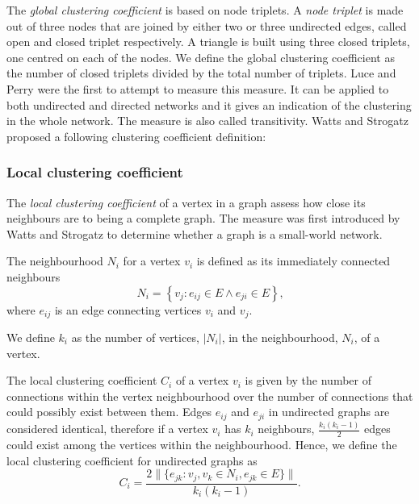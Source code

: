         The \emph{global clustering coefficient} is based on node triplets. A \emph{node triplet} is made out of three nodes that are joined by either two or three undirected edges, called open and closed triplet respectively. A triangle is built using three closed triplets, one centred on each of the nodes. We define the global clustering coefficient as the number of closed triplets divided by the total number of triplets. Luce and Perry were the first to attempt to measure this measure\cite{LucePerry1949}. It can be applied to both undirected and directed networks and it gives an indication of the clustering in the whole network. The measure is also called transitivity\cite{WassermanFaust1994}. Watts and Strogatz proposed a following clustering coefficient definition: \cite{WattsStrogatz1998}

      \subsubsection{Local clustering coefficient}

        The \emph{local clustering coefficient} of a vertex in a graph assess how close its neighbours are to being a complete graph. The measure was first introduced by Watts and Strogatz to determine whether a graph is a small-world network\cite{WattsStrogatz1998}.

        The neighbourhood $N_i$ for a vertex $v_i$ is defined as its immediately connected neighbours
        \begin{equation}
          N_i = \left\{v_j: e_{ij} \in E \wedge e_{ji} \in E\right\} \mbox{,}
        \end{equation}
        where $e_{ij}$ is an edge connecting vertices $v_i$ and $v_j$.
        
        We define $k_i$ as the number of vertices, $|N_i|$, in the neighbourhood, $N_i$, of a vertex.

        The local clustering coefficient $C_i$ of a vertex $v_i$ is given by the number of connections within the vertex neighbourhood over the number of connections that could possibly exist between them. Edges $e_{ij}$ and $e_{ji}$ in undirected graphs are considered identical, therefore if a vertex $v_i$ has $k_i$ neighbours, $\frac{k_i(k_i-1)}{2}$ edges could exist among the vertices within the neighbourhood. Hence, we define the local clustering coefficient for undirected graphs as
        \begin{equation}
          C_i = \frac{2\|\{e_{jk}: v_j,v_k \in N_i, e_{jk} \in E\}\|}{k_i(k_i-1)} \mbox{.}
        \end{equation}

